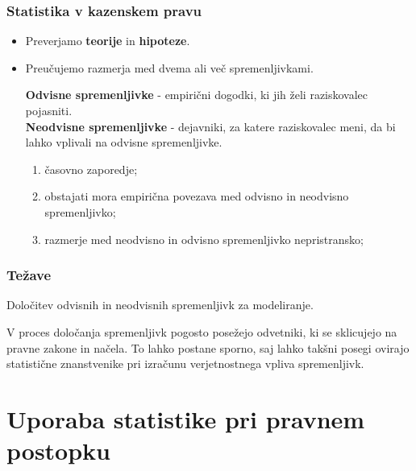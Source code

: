 \documentclass{beamer}
\begin{document}
\begin{frame}
    \frametitle{Statistika v kazenskem pravu}
    \begin{itemize}
        \item Preverjamo \textbf{teorije} in \textbf{hipoteze}.
        \item Preučujemo razmerja med dvema ali več spremenljivkami.\\ \vspace{2mm}
        \begin{block}{}
            \textbf{Odvisne spremenljivke} - empirični dogodki, ki jih želi raziskovalec pojasniti.\\
            \textbf{Neodvisne spremenljivke} - dejavniki, za katere raziskovalec meni, da bi lahko vplivali na odvisne spremenljivke.
        \end{block}
        \begin{enumerate}
            \item časovno zaporedje;
            \item obstajati mora empirična povezava med odvisno in neodvisno spremenljivko;
            \item razmerje med neodvisno in odvisno spremenljivko nepristransko;
        \end{enumerate}
    \end{itemize}
\end{frame}

\begin{frame}
    \frametitle{Težave}
    \begin{block}{}
        \centering
        Določitev odvisnih in neodvisnih spremenljivk za modeliranje.
    \end{block}
    V proces določanja spremenljivk pogosto posežejo odvetniki, ki se sklicujejo na pravne zakone in načela. To lahko postane sporno, saj lahko takšni 
    posegi ovirajo statistične znanstvenike pri izračunu verjetnostnega vpliva spremenljivk.
\end{frame}

\section{Uporaba statistike pri pravnem postopku}
\end{document}
